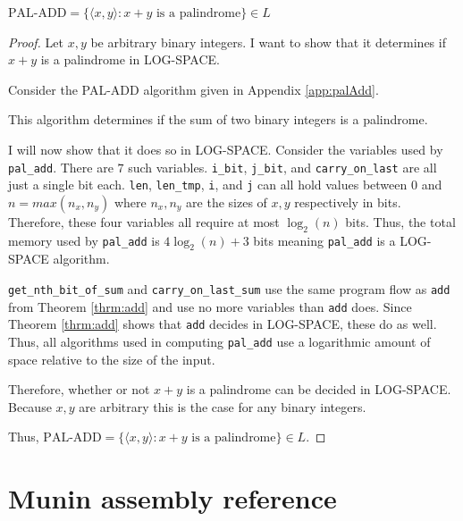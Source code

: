 \documentclass[11pt, a4paper]{article}
\begin{document}
\begin{theorem}
    \(\text{PAL-ADD} = \{\langle x, y \rangle : x + y \text{ is a palindrome}\} \in L\)
\end{theorem}

\begin{proof}
    Let \(x, y\) be arbitrary binary integers.
    I want to show that it determines if \(x + y\) is a palindrome in LOG-SPACE.

    Consider the PAL-ADD algorithm given in Appendix \ref{app:palAdd}.

    This algorithm determines if the sum of two binary integers is a palindrome.

    I will now show that it does so in LOG-SPACE.
    Consider the variables used by \lstinline|pal_add|.
    There are \(7\) such variables.
    \lstinline|i_bit|, \lstinline|j_bit|, and \lstinline|carry_on_last| are all just a single bit each.
    \lstinline|len|, \lstinline|len_tmp|, \lstinline|i|, and \lstinline|j| can all hold values between \(0\) and \(n = max(n_x, n_y)\) where \(n_x, n_y\) are the sizes of \(x, y\) respectively in bits.
    Therefore, these four variables all require at most \(\log_2(n)\) bits.
    Thus, the total memory used by \lstinline|pal_add| is \(4\log_2(n) + 3\) bits meaning \lstinline|pal_add| is a LOG-SPACE algorithm.

    \lstinline|get_nth_bit_of_sum| and \lstinline|carry_on_last_sum| use the same program flow as \lstinline|add| from Theorem \ref{thrm:add} and use no more variables than \lstinline|add| does.
    Since Theorem \ref{thrm:add} shows that \lstinline|add| decides in LOG-SPACE, these do as well.
    Thus, all algorithms used in computing \lstinline|pal_add| use a logarithmic amount of space relative to the size of the input.

    Therefore, whether or not \(x + y\) is a palindrome can be decided in LOG-SPACE.
    Because \(x, y\) are arbitrary this is the case for any binary integers.
    
    Thus, \(\text{PAL-ADD} = \{\langle x, y \rangle : x + y \text{ is a palindrome}\} \in L\).
\end{proof}

\newpage

\section{Munin assembly reference}\label{app:asmRef}
\end{document}
